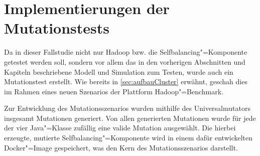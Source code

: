 \section{Implementierungen der Mutationstests}
\label{sec:implMutationTests}

Da in dieser Fallstudie nicht nur Hadoop bzw. die Selfbalancing"=Komponente getestet werden soll, sondern vor allem das in den vorherigen Abschnitten und Kapiteln beschriebene Modell und Simulation zum Testen, wurde auch ein Mutationstest erstellt.
Wie bereits in \autoref{sec:aufbauCluster} erwähnt, geschah dies im Rahmen eines neuen Szenarios der Plattform Hadoop"=Benchmark.

Zur Entwicklung des Mutationsszenarios wurden mithilfe des Universalmutators insgesamt  Mutationen generiert.
Von allen generierten Mutationen wurde für jede der vier Java"=Klasse zufällig eine valide Mutation ausgewählt.
Die hierbei erzeugte, mutierte Selfbalancing"=Komponente wird in einem dafür entwickelten Docker"=Image gespeichert, was den Kern des Mutationsszenarios darstellt.
